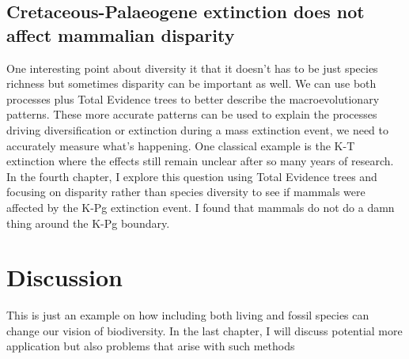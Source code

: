 \subsection{Cretaceous-Palaeogene extinction does not affect mammalian disparity}
One interesting point about diversity it that it doesn't has to be just species richness but sometimes disparity can be important as well.
We can use both processes plus Total Evidence trees to better describe the macroevolutionary patterns.
These more accurate patterns can be used to explain the processes driving diversification or extinction during a mass extinction event, we need to accurately measure what's happening.
One classical example is the K-T extinction where the effects still remain unclear after so many years of research.
In the fourth chapter, I explore this question using Total Evidence trees and focusing on disparity rather than species diversity to see if mammals were affected by the K-Pg extinction event.
I found that mammals do not do a damn thing around the K-Pg boundary.

\section{Discussion} %
This is just an example on how including both living and fossil species can change our vision of biodiversity.
In the last chapter, I will discuss potential more application but also problems that arise with such methods

%